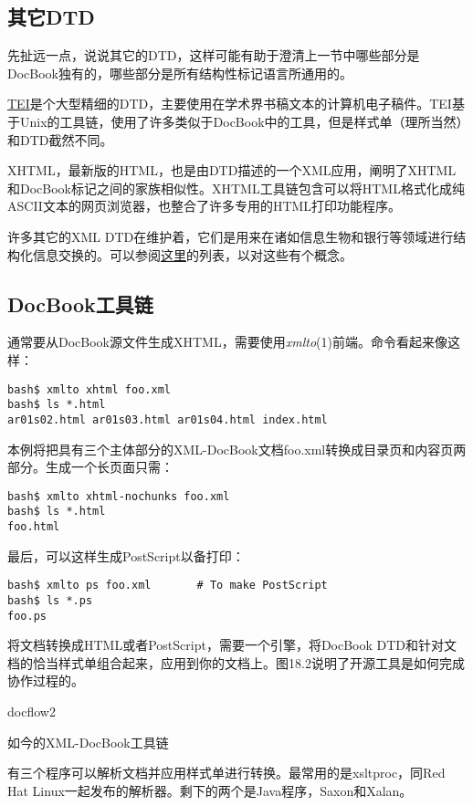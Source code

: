 \documentclass[12pt,oneside]{book}
\begin{document}
\begin{common-format}
\subsection{其它DTD}
先扯远一点，说说其它的DTD，这样可能有助于澄清上一节中哪些部分是DocBook独有的，哪些部分是所有结构性标记语言所通用的。

\href{http://www.tei-c.org/}{TEI}是个大型精细的DTD，主要使用在学术界书稿文本的计算机电子稿件。TEI基于Unix的工具链，使用了许多类似于DocBook中的工具，但是样式单（理所当然）和DTD截然不同。

XHTML，最新版的HTML，也是由DTD描述的一个XML应用，阐明了XHTML和DocBook标记之间的家族相似性。XHTML工具链包含可以将HTML格式化成纯ASCII文本的网页浏览器，也整合了许多专用的HTML打印功能程序。

许多其它的XML DTD在维护着，它们是用来在诸如信息生物和银行等领域进行结构化信息交换的。可以参阅\href{http://www.xml.com/pub/rg/DTD_Repositories}{这里}的列表，以对这些有个概念。

\subsection{DocBook工具链}
通常要从DocBook源文件生成XHTML，需要使用\textit{xmlto}(1)前端。命令看起来像这样：
\begin{Verbatim}
bash$ xmlto xhtml foo.xml
bash$ ls *.html
ar01s02.html ar01s03.html ar01s04.html index.html
\end{Verbatim}

本例将把具有三个主体部分的XML-DocBook文档foo.xml转换成目录页和内容页两部分。生成一个长页面只需：
\begin{Verbatim}
bash$ xmlto xhtml-nochunks foo.xml
bash$ ls *.html
foo.html
\end{Verbatim}

最后，可以这样生成PostScript以备打印：
\begin{Verbatim}
bash$ xmlto ps foo.xml       # To make PostScript
bash$ ls *.ps
foo.ps
\end{Verbatim}

将文档转换成HTML或者PostScript，需要一个引擎，将DocBook DTD和针对文档的恰当样式单组合起来，应用到你的文档上。图18.2说明了开源工具是如何完成协作过程的。
\begin{fig}{docflow2}
\caption{如今的XML-DocBook工具链}
\label{fig:docflow2}
\end{fig}

有三个程序可以解析文档并应用样式单进行转换。最常用的是xsltproc，同Red Hat Linux一起发布的解析器。剩下的两个是Java程序，Saxon和Xalan。


\end{common-format}
\end{document}
